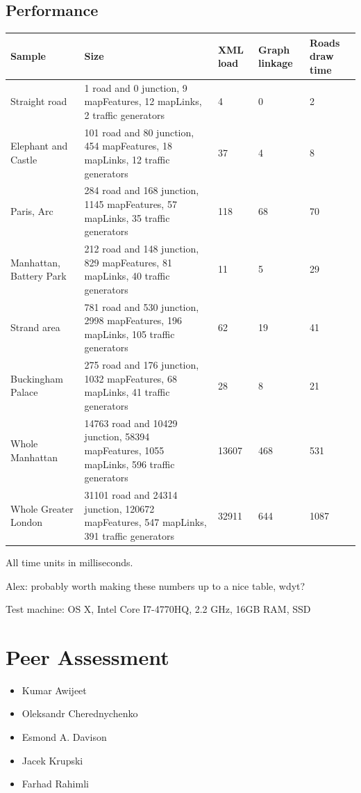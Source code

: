 \subsection{Performance}

\begin{center}
\begin{longtabu} to \textwidth {|
    X[2,l]|
    X[4,l]|
    X[3,c]|
    X[3,c]|
    X[3,c]|
    }
    \hline
    \textbf{Sample} & \textbf{Size} & \textbf{XML load} & \textbf{Graph linkage} & \textbf{Roads draw time} \\ \hline
Straight road & 1 road and 0 junction, 9 mapFeatures, 12 mapLinks, 2 traffic generators & 4 & 0 & 2 \\ \hline
Elephant and Castle & 101 road and 80 junction, 454 mapFeatures, 18 mapLinks, 12 traffic generators & 37 & 4 & 8 \\ \hline
Paris, Arc & 284 road and 168 junction, 1145 mapFeatures, 57 mapLinks, 35 traffic generators & 118 & 68 & 70 \\ \hline
Manhattan, Battery Park & 212 road and 148 junction, 829 mapFeatures, 81 mapLinks, 40 traffic generators & 11 & 5 & 29 \\ \hline
Strand area & 781 road and 530 junction, 2998 mapFeatures, 196 mapLinks, 105 traffic generators & 62 & 19 & 41 \\ \hline
Buckingham Palace& 275 road and 176 junction, 1032 mapFeatures, 68 mapLinks, 41 traffic generators & 28 & 8 & 21 \\ \hline
Whole Manhattan & 14763 road and 10429 junction, 58394 mapFeatures, 1055 mapLinks, 596 traffic generators & 13607 & 468 & 531 \\ \hline
Whole Greater London & 31101 road and 24314 junction, 120672 mapFeatures, 547 mapLinks, 391 traffic generators & 32911 & 644 & 1087 \\ \hline

\end{longtabu}
\end{center}
All time units in milliseconds.

Alex: probably worth making these numbers up to a nice table, wdyt?

Test machine: OS X, Intel Core I7-4770HQ, 2.2 GHz, 16GB RAM, SSD


\section{Peer Assessment}

 \begin{itemize}
        \item Kumar Awijeet
		\item Oleksandr Cherednychenko
		\item Esmond A. Davison
		\item Jacek Krupski
		\item Farhad Rahimli
    \end{itemize}
